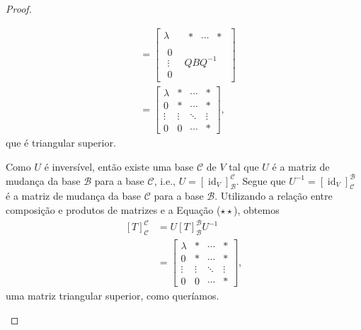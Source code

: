\begin{proof}
\begin{itemize}
\begin{align*}
			&=\begin{bmatrix}\lambda&\begin{matrix}\ast&\cdots&\ast\end{matrix}\\\begin{matrix}0\\\vdots\\0\end{matrix}&QBQ^{-1}\end{bmatrix}\\
			&=\begin{bmatrix}
			\lambda&\ast&\cdots&\ast\\
			0&\ast&\cdots&\ast\\
			\vdots&\vdots&\ddots&\vdots\\
			0&0&\cdots&\ast\end{bmatrix},\tag{$\star\star$}
	\end{align*}
	que é triangular superior.
	
	Como $U$ é inversível, então existe uma base $\mathcal{C}$ de $V$ tal que $U$ é a matriz de mudança da base $\mathcal{B}$ para a base $\mathcal{C}$, i.e., $U=\left[\operatorname{id}_V\right]_{\mathcal{B}}^{\mathcal{C}}$. Segue que $U^{-1}=\left[\operatorname{id}_V\right]_{\mathcal{C}}^{\mathcal{B}}$ é a matriz de mudança da base $\mathcal{C}$ para a base $\mathcal{B}$. Utilizando a relação entre composição e produtos de matrizes e a Equação ($\star\star$), obtemos
	\begin{align*}
	    \left[T\right]_{\mathcal{C}}^{\mathcal{C}}
	        &=U\left[T\right]_{\mathcal{B}}^{\mathcal{B}}U^{-1}\\
	        &=\begin{bmatrix}
			\lambda&\ast&\cdots&\ast\\
			0&\ast&\cdots&\ast\\
			\vdots&\vdots&\ddots&\vdots\\
			0&0&\cdots&\ast\end{bmatrix},
	\end{align*}
	uma matriz triangular superior, como queríamos.
	\end{itemize}
\end{proof}